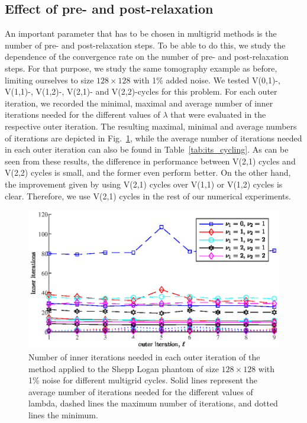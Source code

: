 \subsection{Effect of pre- and post-relaxation}
\label{ssec:relaxation_comparison}
An important parameter that has to be chosen in multigrid methods is the number of pre- and post-relaxation steps. To be able to do this, we study the dependence of the convergence rate on the number of pre- and post-relaxation steps. For that purpose, we study the same tomography example as before, limiting ourselves to size $128 \times 128$ with 1\% added noise. We tested V(0,1)-, V(1,1)-, V(1,2)-, V(2,1)- and V(2,2)-cycles for this problem. For each outer iteration, we recorded the minimal, maximal and average number of inner iterations needed for the different values of $\lambda$ that were evaluated in the respective outer iteration. The resulting maximal, minimal and average numbers of iterations are depicted in Fig.~\ref{fig:its_cycling}, while the average number of iterations needed in each outer iteration can also be found in Table~\ref{tab:its_cycling}. As can be seen from these results, the difference in performance between V(2,1) cycles and V(2,2) cycles is small, and the former even perform better.  On the other hand, the improvement given by using V(2,1) cycles over V(1,1) or V(1,2) cycles is clear.   Therefore, we use V(2,1) cycles in the rest of our numerical experiments.
\begin{figure}[htbp]
\begin{center}
\includegraphics{figures/its_cycling}
\caption{Number of inner iterations needed in each outer iteration of the method applied to the Shepp Logan phantom of size $128 \times 128$ with 1\% noise for different multigrid cycles. Solid lines represent the average number of iterations needed for the different values of lambda, dashed lines the maximum number of iterations, and dotted lines the minimum.}
\label{fig:its_cycling}
\end{center}
\end{figure}
